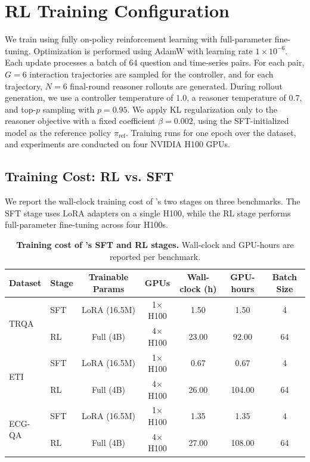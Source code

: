 \section{RL Training Configuration}
\label{app:trainig_details}
We train \algoname using fully on-policy reinforcement learning with full-parameter fine-tuning. Optimization is performed using AdamW with learning rate $1 \times 10^{-6}$. Each update processes a batch of 64 question and time-series pairs. For each pair, $G = 6$ interaction trajectories are sampled for the controller, and for each trajectory, $N = 6$ final-round reasoner rollouts are generated. 
During rollout generation, we use a controller temperature of $1.0$, a reasoner temperature of $0.7$, and top-$p$ sampling with $p = 0.95$. We apply KL regularization only to the reasoner objective with a fixed coefficient $\beta = 0.002$, using the SFT-initialized model as the reference policy $\pi_{\mathrm{ref}}$. Training runs for one epoch over the dataset, and experiments are conducted on four NVIDIA H100 GPUs.

\subsection{Training Cost: RL vs. SFT}
\label{app:training_cost}

We report the wall-clock training cost of \algoname's two stages on three benchmarks. The SFT stage uses LoRA adapters on a single H100, while the RL stage performs full-parameter fine-tuning across four H100s.

\begin{table}[h]
\centering
\small
\caption{\textbf{Training cost of \algoname's SFT and RL stages.} Wall-clock and GPU-hours are reported per benchmark.}
\label{tab:training_cost}
\setlength{\tabcolsep}{5pt}
\begin{tabular}{llccccc}
\toprule
\textbf{Dataset} & \textbf{Stage} & \textbf{Trainable Params} & \textbf{GPUs} & \textbf{Wall-clock (h)} & \textbf{GPU-hours} & \textbf{Batch Size} \\
\midrule
\multirow{2}{*}{TRQA}
& SFT & LoRA (16.5M)  & 1$\times$H100 & 1.50  & 1.50   & 4  \\
& RL  & Full (4B)     & 4$\times$H100 & 23.00 & 92.00  & 64 \\
\midrule
\multirow{2}{*}{ETI}
& SFT & LoRA (16.5M)  & 1$\times$H100 & 0.67  & 0.67   & 4  \\
& RL  & Full (4B)     & 4$\times$H100 & 26.00 & 104.00 & 64 \\
\midrule
\multirow{2}{*}{ECG-QA}
& SFT & LoRA (16.5M)  & 1$\times$H100 & 1.35  & 1.35   & 4  \\
& RL  & Full (4B)     & 4$\times$H100 & 27.00 & 108.00 & 64 \\
\bottomrule
\end{tabular}
\end{table}


